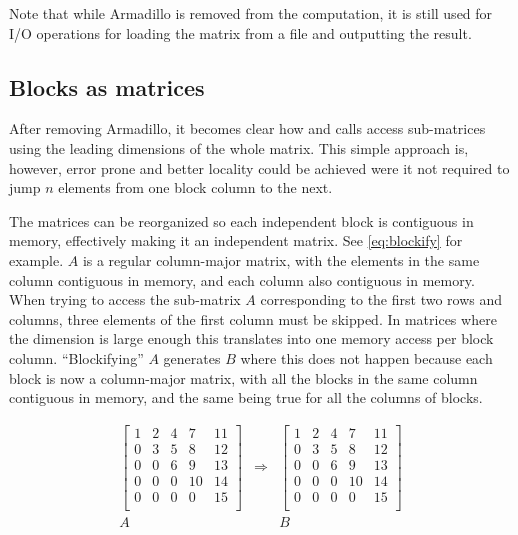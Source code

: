 \documentclass[../thesis]{subfiles}
\begin{document}
		Note that while Armadillo is removed from the computation, it is still used for I/O operations for loading the matrix from a file and outputting the result.

		\subsection{Blocks as matrices}
		\label{subsec:blockify}
		After removing Armadillo, it becomes clear how \blas and \lapack calls access sub-matrices using the leading dimensions of the whole matrix. This simple approach is, however, error prone and better locality could be achieved were it not required to jump $n$ elements from one block column to the next.

		The matrices can be reorganized so each independent block is contiguous in memory, effectively making it an independent matrix. See \cref{eq:blockify} for example. $A$ is a regular column-major matrix, with the elements in the same column contiguous in memory, and each column also contiguous in memory. When trying to access the sub-matrix $A$ corresponding to the first two rows and columns, three elements of the first column must be skipped. In matrices where the dimension is large enough this translates into one memory access per block column. ``Blockifying'' $A$ generates $B$ where this does not happen because each block is now a column-major matrix, with all the blocks in the same column contiguous in memory, and the same being true for all the columns of blocks.

		\begin{equation}
			\begin{array}{ccc}
				\left[
				\begin{array}{c|c|c|c|c}
					 1 &  2 &  4 &  7 & 11  \\
					 0 &  3 &  5 &  8 & 12  \\
					 0 &  0 &  6 &  9 & 13  \\
					 0 &  0 &  0 & 10 & 14  \\
					 0 &  0 &  0 &  0 & 15  \\
				\end{array}
				\right] & \Rightarrow & \left[
				\begin{array}{cc|cc|c}
					 1 &  2 &  4 &  7 & 11  \\
					 0 &  3 &  5 &  8 & 12  \\
					 \hline
					 0 &  0 &  6 &  9 & 13  \\
					 0 &  0 &  0 & 10 & 14  \\
					 \hline
					 0 &  0 &  0 &  0 & 15  \\
				\end{array}
				\right] \\
				A & & B
			\end{array}
			\label{eq:blockify}
		\end{equation}
\end{document}
